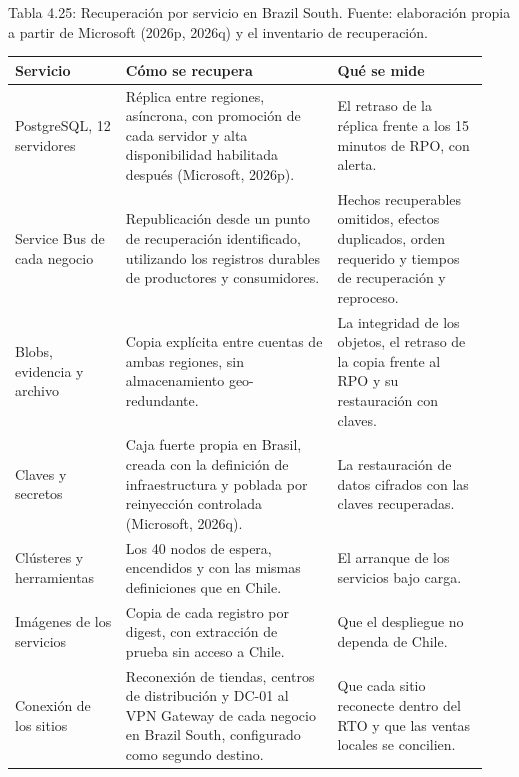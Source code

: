 \documentclass[11pt]{article}
\begin{document}
\par\vspace{0pt plus 10\baselineskip}\vspace{0pt plus -10\baselineskip}

Tabla 4.25: Recuperación por servicio en Brazil South. Fuente: elaboración propia a partir de Microsoft (2026p, 2026q) y el inventario de recuperación.\par\nopagebreak
\begin{longtable}{@{}p{0.22\linewidth}p{0.42\linewidth}p{0.30\linewidth}@{}}
\toprule Servicio & Cómo se recupera & Qué se mide \\
\midrule\endhead\bottomrule\endlastfoot
PostgreSQL, 12 servidores & Réplica entre regiones, asíncrona, con promoción de cada servidor y alta disponibilidad habilitada después (Microsoft, 2026p). & El retraso de la réplica frente a los 15 minutos de RPO, con alerta. \\
Service Bus de cada negocio & Republicación desde un punto de recuperación identificado, utilizando los registros durables de productores y consumidores. & Hechos recuperables omitidos, efectos duplicados, orden requerido y tiempos de recuperación y reproceso. \\
Blobs, evidencia y archivo & Copia explícita entre cuentas de ambas regiones, sin almacenamiento geo-redundante. & La integridad de los objetos, el retraso de la copia frente al RPO y su restauración con claves. \\
Claves y secretos & Caja fuerte propia en Brasil, creada con la definición de infraestructura y poblada por reinyección controlada (Microsoft, 2026q). & La restauración de datos cifrados con las claves recuperadas. \\
Clústeres y herramientas & Los 40 nodos de espera, encendidos y con las mismas definiciones que en Chile. & El arranque de los servicios bajo carga. \\
Imágenes de los servicios & Copia de cada registro por digest, con extracción de prueba sin acceso a Chile. & Que el despliegue no dependa de Chile. \\
Conexión de los sitios & Reconexión de tiendas, centros de distribución y DC-01 al VPN Gateway de cada negocio en Brazil South, configurado como segundo destino. & Que cada sitio reconecte dentro del RTO y que las ventas locales se concilien. \\
\end{longtable}
\end{document}
